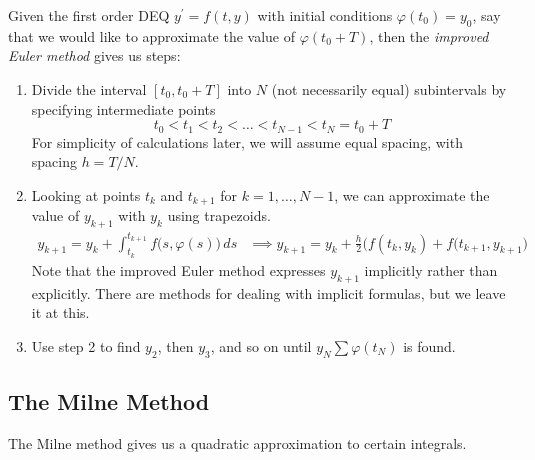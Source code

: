 \documentclass{article}
\newcounter{theorem}[section]
\begin{document}
    \begin{theorem}
      \label{thm:improved-eulers-method}
    Given the first order DEQ $y^\prime = f(t, y)$ with initial conditions $\varphi(t_0) = y_0$, say that we would like to approximate the value of $\varphi(t_0 + T)$, then the \textit{improved Euler method} gives us steps: 
    \begin{enumerate}
        \item Divide the interval $[t_0, t_0 + T]$ into $N$ (not necessarily equal) subintervals by specifying intermediate points 
        \begin{equation}
          t_0 < t_1 < t_2 < \ldots < t_{N-1} < t_N = t_0 + T
        \end{equation}
        For simplicity of calculations later, we will assume equal spacing, with spacing $h = T/N$. 
        \item Looking at points $t_k$ and $t_{k+1}$ for $k = 1, \ldots, N-1$, we can approximate the value of $y_{k+1}$ with $y_k$ using trapezoids.
        \begin{align*}
            y_{k+1} = y_k + \int_{t_k}^{t_{k+1}} f\big( s, \varphi(s)\big)\,ds & \implies y_{k+1} = y_k + \frac{h}{2} \big(f(t_k, y_k) + f(t_{k+1}, y_{k+1}\big) 
        \end{align*}
        Note that the improved Euler method expresses $y_{k+1}$ implicitly rather than explicitly. There are methods for dealing with implicit formulas, but we leave it at this. 
        \item Use step 2 to find $y_2$, then $y_3$, and so on until $y_N \sum \varphi(t_N)$ is found. 
    \end{enumerate}
    \end{theorem}

  \subsection{The Milne Method}

    The Milne method gives us a quadratic approximation to certain integrals. 
\end{document}
